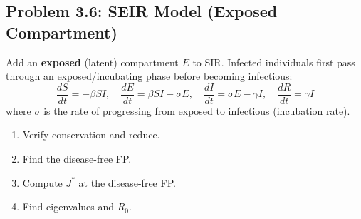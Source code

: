 \documentclass[10pt]{article}
\begin{document}
\subsection{Problem 3.6: SEIR Model (Exposed Compartment)}

\begin{problem}
Add an \textbf{exposed} (latent) compartment $E$ to SIR. Infected individuals first pass through an exposed/incubating phase before becoming infectious:
\[
\frac{dS}{dt} = -\beta SI, \quad \frac{dE}{dt} = \beta SI - \sigma E, \quad \frac{dI}{dt} = \sigma E - \gamma I, \quad \frac{dR}{dt} = \gamma I
\]
where $\sigma$ is the rate of progressing from exposed to infectious (incubation rate).

\begin{enumerate}[label=(\alph*)]
\item Verify conservation and reduce.
\item Find the disease-free FP.
\item Compute $J^*$ at the disease-free FP.
\item Find eigenvalues and $R_0$.
\end{enumerate}
\end{problem}
\end{document}
